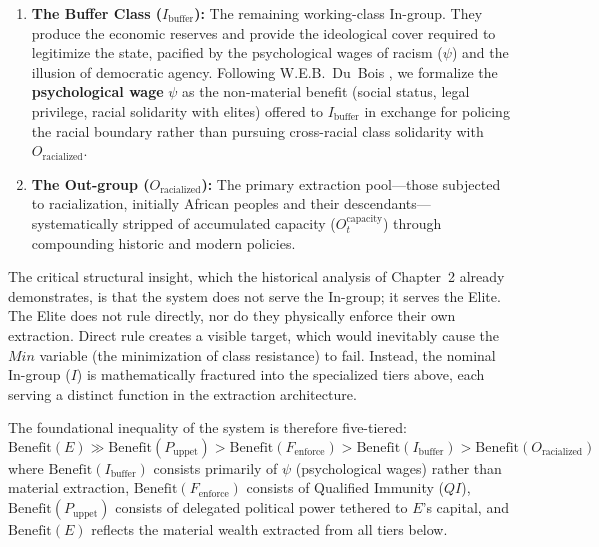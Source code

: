 \documentclass[12pt,openany]{book}
\begin{document}
\begin{enumerate}
    \item \textbf{The Buffer Class ($I_{\text{buffer}}$):} The remaining working-class In-group. They produce the economic reserves and provide the ideological cover required to legitimize the state, pacified by the psychological wages of racism ($\psi$) and the illusion of democratic agency. Following W.E.B.\ Du~Bois \cite{dubois}, we formalize the \textbf{psychological wage} $\psi$ as the non-material benefit (social status, legal privilege, racial solidarity with elites) offered to $I_{\text{buffer}}$ in exchange for policing the racial boundary rather than pursuing cross-racial class solidarity with $O_{\text{racialized}}$.

    \item \textbf{The Out-group ($O_{\text{racialized}}$):} The primary extraction pool---those subjected to racialization, initially African peoples and their descendants---systematically stripped of accumulated capacity ($O_t^{\text{capacity}}$) through compounding historic and modern policies.
\end{enumerate}

The critical structural insight, which the historical analysis of Chapter~2 already demonstrates, is that the system does not serve the In-group; it serves the Elite. The Elite does not rule directly, nor do they physically enforce their own extraction. Direct rule creates a visible target, which would inevitably cause the $Min$ variable (the minimization of class resistance) to fail. Instead, the nominal In-group ($I$) is mathematically fractured into the specialized tiers above, each serving a distinct function in the extraction architecture.

The foundational inequality of the system is therefore five-tiered:
\[
\text{Benefit}(E) \gg \text{Benefit}(P_{\text{uppet}}) > \text{Benefit}(F_{\text{enforce}}) > \text{Benefit}(I_{\text{buffer}}) > \text{Benefit}(O_{\text{racialized}})
\]
where $\text{Benefit}(I_{\text{buffer}})$ consists primarily of $\psi$ (psychological wages) rather than material extraction, $\text{Benefit}(F_{\text{enforce}})$ consists of Qualified Immunity ($QI$), $\text{Benefit}(P_{\text{uppet}})$ consists of delegated political power tethered to $E$'s capital, and $\text{Benefit}(E)$ reflects the material wealth extracted from all tiers below.
\end{document}
